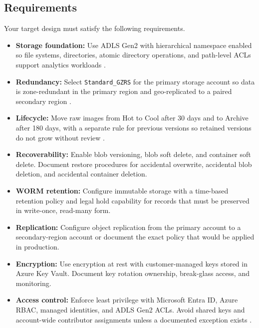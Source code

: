 \subsection*{Requirements}
Your target design must satisfy the following requirements.

\begin{itemize}
    \item \textbf{Storage foundation:} Use ADLS Gen2 with hierarchical namespace enabled so file systems, directories, atomic directory operations, and path-level ACLs support analytics workloads \cite{microsoft2025adlsgen2}.
    \item \textbf{Redundancy:} Select \texttt{Standard\_GZRS} for the primary storage account so data is zone-redundant in the primary region and geo-replicated to a paired secondary region \cite{microsoft2025redundancy}.
    \item \textbf{Lifecycle:} Move raw images from Hot to Cool after 30 days and to Archive after 180 days, with a separate rule for previous versions so retained versions do not grow without review \cite{microsoft2025accessTiers,microsoft2025lifecycle}.
    \item \textbf{Recoverability:} Enable blob versioning, blob soft delete, and container soft delete. Document restore procedures for accidental overwrite, accidental blob deletion, and accidental container deletion.
    \item \textbf{WORM retention:} Configure immutable storage with a time-based retention policy and legal hold capability for records that must be preserved in write-once, read-many form.
    \item \textbf{Replication:} Configure object replication from the primary account to a secondary-region account or document the exact policy that would be applied in production.
    \item \textbf{Encryption:} Use encryption at rest with customer-managed keys stored in Azure Key Vault. Document key rotation ownership, break-glass access, and monitoring.
    \item \textbf{Access control:} Enforce least privilege with Microsoft Entra ID, Azure RBAC, managed identities, and ADLS Gen2 ACLs. Avoid shared keys and account-wide contributor assignments unless a documented exception exists \cite{microsoft2025rbac}.
\end{itemize}

